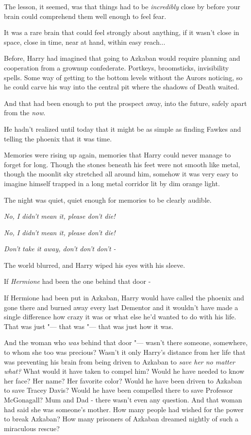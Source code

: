 The lesson, it seemed, was that things had to be \emph{incredibly} close
by before your brain could comprehend them well enough to feel fear.

It was a rare brain that could feel strongly about anything, if it
wasn't close in space, close in time, near at hand, within easy
reach...

Before, Harry had imagined that going to Azkaban would require planning
and cooperation from a grownup confederate. Portkeys, broomsticks,
invisibility spells. Some way of getting to the bottom levels without
the Aurors noticing, so he could carve his way into the central pit
where the shadows of Death waited.

And that had been enough to put the prospect away, into the future,
safely apart from the \emph{now}.

He hadn't realized until today that it might be as simple as finding
Fawkes and telling the phoenix that it was time.

Memories were rising up again, memories that Harry could never manage to
forget for long. Though the stones beneath his feet were not smooth like
metal, though the moonlit sky stretched all around him, somehow it was
very easy to imagine himself trapped in a long metal corridor lit by dim
orange light.

The night was quiet, quiet enough for memories to be clearly audible.

\emph{No, I didn't mean it, please don't die!}

\emph{No, I didn't mean it, please don't die!}

\emph{Don't take it away, don't don't don't -}

The world blurred, and Harry wiped his eyes with his sleeve.

If \emph{Hermione} had been the one behind that door -

If Hermione had been put in Azkaban, Harry would have called the phoenix
and gone there and burned away every last Dementor and it wouldn't have
made a single difference how crazy it was or what else he'd wanted to do
with his life. That was just "--- that was "--- that was just how it was.

And the woman who \emph{was} behind that door "--- wasn't there someone,
somewhere, to whom she too was precious? Wasn't it only Harry's distance
from her life that was preventing his brain from being driven to Azkaban
to \emph{save her no matter what?} What would it have taken to compel
him? Would he have needed to know her face? Her name? Her favorite
color? Would he have been driven to Azkaban to save Tracey Davis? Would
he have been compelled there to save Professor McGonagall? Mum and Dad -
there wasn't even any question. And that woman had said she was
someone's mother. How many people had wished for the power to break
Azkaban? How many prisoners of Azkaban dreamed nightly of such a
miraculous rescue?

